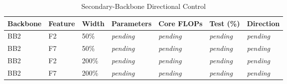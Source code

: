 \begin{table}[!t]
\caption{Secondary-Backbone Directional Control}
\label{tab:bb2-control}
\centering
\footnotesize
\begin{tabular}{@{}lll>{\centering\arraybackslash}l>{\centering\arraybackslash}l>{\centering\arraybackslash}l l@{}}
\toprule
Backbone & Feature & Width & Parameters & Core FLOPs & Test (\%) & Direction \\
\midrule
BB2 & F2 & 50\% & \textit{pending} & \textit{pending} & \textit{pending} & \textit{pending} \\
BB2 & F7 & 50\% & \textit{pending} & \textit{pending} & \textit{pending} & \textit{pending} \\
BB2 & F2 & 200\% & \textit{pending} & \textit{pending} & \textit{pending} & \textit{pending} \\
BB2 & F7 & 200\% & \textit{pending} & \textit{pending} & \textit{pending} & \textit{pending} \\
\bottomrule
\end{tabular}
\end{table}
